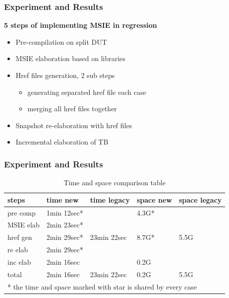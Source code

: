 \documentclass{beamer}
\begin{document}
\begin{frame}
  \frametitle{Experiment and Results}
  \textbf{5 steps of implementing MSIE in regression}
  \begin{itemize}
  \item Pre-compilation on split DUT
  \item MSIE elaboration based on libraries
  \item Href files generation, 2 sub steps
    \begin{itemize}
    \item generating separated href file each case
    \item merging all href files together
    \end{itemize}
  \item Snapshot re-elaboration with href files
  \item Incremental elaboration of TB
  \end{itemize}
\end{frame}


\begin{frame}
  \frametitle{Experiment and Results}
  \begin{table}
    \centering
    \begin{tabular}{lllll}
      \toprule
      \textbf{steps} & \textbf{time new} & \textbf{time legacy} &  \textbf{space new} & \textbf{space legacy} \\
      \midrule
      pre comp & 1min 12sec* & \multirow{5}{*}{23min 22sec} & 4.3G* & \multirow{5}{*}{5.5G} \\
      \cline{1-2}\cline{4-4}
      MSIE elab & 2min 23sec* & & \multirow{3}{*}{8.7G*} & \\
      \cline{1-2}
      href gen & 2min 29sec* & & & \\
      \cline{1-2}
      re elab & 2min 29sec* & & & \\
      \cline{1-2}\cline{4-4}
      inc elab & 2min 16sec & & 0.2G & \\
      \hline
      total & 2min 16sec & 23min 22sec & 0.2G & 5.5G \\
      \bottomrule
      \multicolumn{5}{l}{\footnotesize{* the time and space marked with star is shared by every case}}
    \end{tabular}
    \caption{Time and space comparison table}
  \end{table}
\end{frame}
\end{document}
